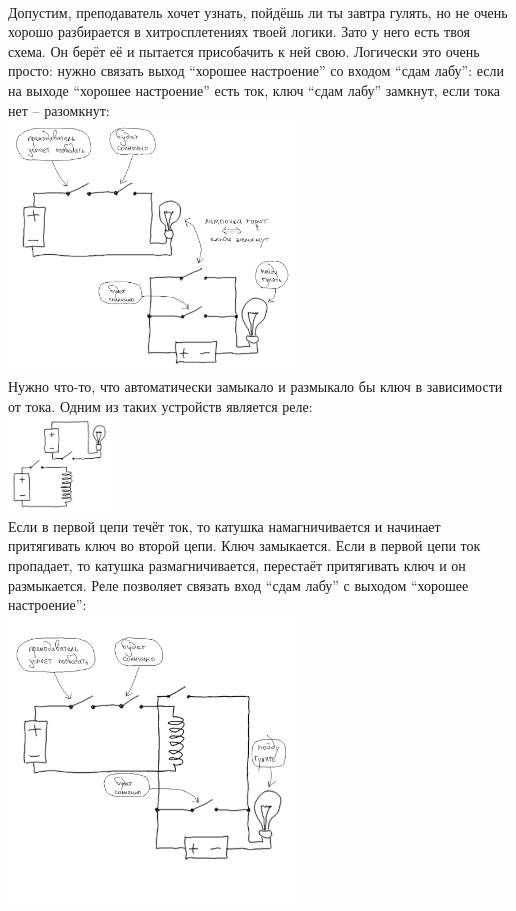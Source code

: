 \documentclass[11pt]{book}
\begin{document}
\\
Допустим, преподаватель хочет узнать, пойдёшь ли ты завтра гулять, но не очень
хорошо разбирается в хитросплетениях твоей логики. Зато у него есть твоя схема.
Он берёт её и пытается присобачить к ней свою. Логически это очень просто:
нужно связать выход ``хорошее настроение'' со входом ``сдам лабу'': если на выходе
``хорошее настроение'' есть ток, ключ ``сдам лабу'' замкнут, если тока нет --
разомкнут:
\\
\includegraphics[width=3in]{pic/10.png}
\\
Нужно что-то, что автоматически замыкало и размыкало бы ключ в зависимости от тока.
Одним из таких устройств является реле:
\\
\includegraphics[height=1in]{pic/11.png}
\\
Если в первой цепи течёт ток, то катушка намагничивается и начинает притягивать
ключ во второй цепи. Ключ замыкается. Если в первой цепи ток пропадает, то катушка размагничивается,
перестаёт притягивать ключ и он размыкается. Реле позволяет связать вход
``сдам лабу'' с выходом ``хорошее настроение'':
\\
\includegraphics[width=3in]{pic/12.png}
\end{document}
